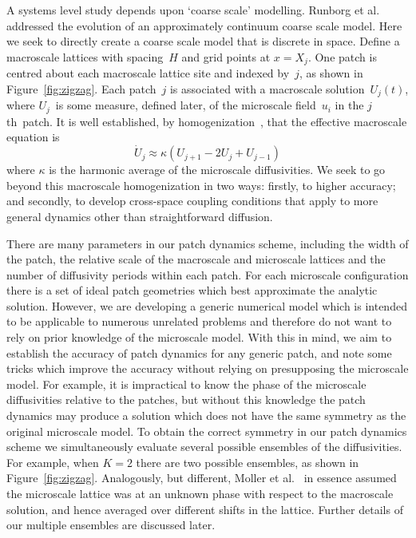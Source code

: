 \documentclass[12pt,a4paper]{article}
\begin{document}
A systems level study depends upon `coarse scale' modelling.  Runborg et al.~\cite{Runborg2002} addressed the evolution of an approximately continuum  coarse scale model.  Here we seek to directly create a coarse scale model that is discrete in space.
Define a macroscale lattices with spacing~$H$ and grid points at $x=X_j$. One patch is centred about each macroscale lattice site and indexed by~$j$, as shown in Figure~\ref{fig:zigzag}. Each patch~$j$ is associated with a macroscale solution~$U_j(t)$, where $U_j$~is some measure, defined later, of the microscale field~$u_i$ in the $j$th~patch. It is well established, by homogenization~\cite{Knapek98}, that the effective macroscale equation is
\begin{equation}
\dot{U}_j\approx \kappa(U_{j+1}-2U_j+U_{j-1})
\end{equation}
where $\kappa$ is the harmonic average of the microscale diffusivities. We seek to go beyond this macroscale homogenization in two ways: firstly, to higher accuracy; and secondly, to develop cross-space coupling conditions that apply to more general dynamics other than straightforward diffusion. 

There are many parameters in our patch dynamics scheme, including the width of the patch, the relative scale of the macroscale and microscale lattices and the number of diffusivity periods within each patch. For each microscale configuration there is a set of ideal patch geometries which best approximate the analytic solution. However, we are developing a generic numerical model which is intended to be applicable to numerous unrelated problems and therefore do not want to rely on prior knowledge of the microscale model. With this in mind, we aim to establish the accuracy of patch dynamics for any generic patch, and note some tricks which improve the accuracy without relying on presupposing the microscale model. For example, it is impractical to know the phase of the microscale diffusivities relative to the patches, but without this knowledge the patch dynamics may produce a solution which does not have the same symmetry as the original microscale model. To obtain the correct symmetry in our patch dynamics scheme we simultaneously evaluate several possible ensembles of the diffusivities. For example, when $K=2$ there are two possible ensembles, as shown in Figure~\ref{fig:zigzag}.  Analogously, but different, Moller et al.~\cite{Moller2005} in essence assumed the microscale lattice was at an unknown phase with respect to the macroscale solution, and hence averaged over different shifts in the lattice.  Further details of our multiple ensembles are discussed later. 
\end{document}
